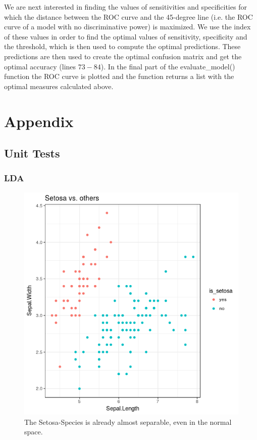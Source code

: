 \documentclass{article}
\begin{document}
We are next interested in finding the values of sensitivities and specificities for which the distance between the ROC curve and the 45-degree line (i.e. the ROC curve of a model with no discriminative power) is maximized. We use the index of these values in order to find the optimal values of sensitivity, specificity and the threshold, which is then used to compute the optimal predictions. These predictions are then used to create the optimal confusion matrix and get the optimal accuracy (lines $73-84$). In the final part of the evaluate\_model() function the ROC curve is plotted and the function returns a list with the optimal measures calculated above.
 
\section{Appendix}

\subsection{Unit Tests}
\subsubsection{LDA}

\begin{figure}
\label{iris}
\begin{center}
\includegraphics[scale=0.3, trim={10mm 20mm 30mm 30mm}]{../LDA/iris.png}
\end{center}
\caption{The Setosa-Species is already almost separable, even in the normal space.}
\end{figure}
\end{document}
